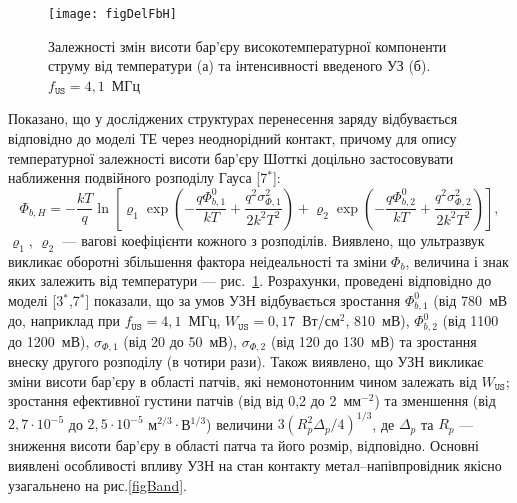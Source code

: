 \begin{figure}
\center
\texttt{[image: figDelFbH]}
\caption{\label{figDelFbH}
Залежності змін висоти бар'єру високотемпературної компоненти струму від температури (а) та інтенсивності введеного УЗ (б).
$f_\mathtt{US}=4,1$~МГц
}%
\end{figure}

Показано, що у досліджених структурах перенесення заряду відбувається відповідно до моделі ТЕ через неоднорідний контакт,
причому для опису температурної залежності висоти бар'єру Шотткі доцільно застосовувати наближення подвійного розподілу Гауса
[7$^*$]:
\begin{equation}
\label{eqDG}
  \Phi_{b,H}=-\frac{kT}{q}\ln\left[\varrho_1\exp\left(-\frac{q\Phi_{b,1}^0}{kT}+
  \frac{q^2\sigma^2_{\Phi,1}}{2k^2T^2}\right)
   +
  \varrho_2\exp\left(-\frac{q\Phi_{b,2}^{0}}{kT}+
  \frac{q^2\sigma^2_{\Phi,2}}{2k^2T^2}\right)\right],
\end{equation}
$\varrho_1$, $\varrho_2$  --- вагові коефіцієнти кожного з розподілів.
Виявлено, що ультразвук викликає оборотні збільшення фактора неідеальності та зміни $\Phi_{b}$,
величина і знак яких залежить від температури --- рис.~\ref{figDelFbH}.
Розрахунки, проведені відповідно до моделі
[3$^*$,7$^*$] показали, що за умов УЗН відбувається зростання
$\Phi_{b,1}^0$ (від 780~мВ до, наприклад при $f_\mathtt{US}=4,1$~МГц, $W_\mathtt{US}=0,17$~Вт/см$^2$,  810~мВ),
$\Phi_{b,2}^0$ (від 1100 до  1200~мВ),
$\sigma_{\Phi,1}$ (від 20 до  50~мВ),
$\sigma_{\Phi,2}$ (від 120 до  130~мВ) та
зростання внеску другого розподілу (в чотири рази).
Також виявлено,
що УЗН викликає зміни висоти бар'єру в області патчів, які немонотонним чином залежать від $W_\mathtt{US}$;
зростання ефективної густини патчів (від від 0,2 до 2~мм$^{-2}$) та зменшення (від $2,7\cdot10^{-5}$ до $2,5\cdot10^{-5}$ м$^{2/3}\cdot$В$^{1/3}$)
величини $3(R_p^2\Delta_p/4)^{1/3}$, де $\Delta_p$ та $R_p$ --- зниження висоти бар'єру в області патча та його розмір, відповідно.
Основні виявлені особливості впливу УЗН на стан контакту метал--напівпровідник якісно узагальнено на рис.\ref{figBand}.



